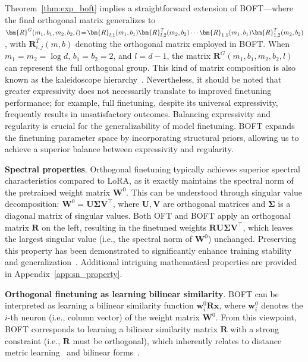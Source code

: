 Theorem~\ref{thm:exp_boft} implies a straightforward extension of BOFT—where the final orthogonal matrix generalizes to $\thickmuskip=2mu \medmuskip=2mu \bm{R}^G(m_1,b_1,m_2,b_2,l)=\bm{R}_{l,1}(m_1,b_1)\bm{R}_{l,2}^T(m_2,b_2)\cdots\bm{R}_{1,1}(m_1,b_1)\bm{R}_{1,2}^T(m_2,b_2)$, with $\bm{R}_{i,j}^T(m,b)$ denoting the orthogonal matrix employed in BOFT. When $m_1=m_2=\log d$, $b_1=b_2=2$, and $l=d-1$, the matrix $\bm{R}^G(m_1,b_1,m_2,b_2,l)$ can represent the full orthogonal group. This kind of matrix composition is also known as the kaleidoscope hierarchy~\cite{dao2019kaleidoscope}. Nevertheless, it should be noted that greater expressivity does not necessarily translate to improved finetuning performance; for example, full finetuning, despite its universal expressivity, frequently results in unsatisfactory outcomes. Balancing expressivity and regularity is crucial for the generalizability of model finetuning. BOFT expands the finetuning parameter space by incorporating structural priors, allowing us to achieve a superior balance between expressivity and regularity.

\textbf{Spectral properties}. Orthogonal finetuning typically achieves superior spectral characteristics compared to LoRA, as it exactly maintains the spectral norm of the pretrained weight matrix $\bm{W}^0$. This can be understood through singular value decomposition: $\bm{W}^0=\bm{U}\bm{\Sigma}\bm{V}^\top$, where $\bm{U},\bm{V}$ are orthogonal matrices and $\bm{\Sigma}$ is a diagonal matrix of singular values. Both OFT and BOFT apply an orthogonal matrix $\bm{R}$ on the left, resulting in the finetuned weights $\bm{R}\bm{U}\bm{\Sigma}\bm{V}^\top$, which leaves the largest singular value (i.e., the spectral norm of $\bm{W}^0$) unchanged. Preserving this property has been demonstrated to significantly enhance training stability and generalization~\cite{miyato2018spectral,yoshida2017spectral}. Additional intriguing mathematical properties are provided in Appendix~\ref{app:sn_property}.

\textbf{Orthogonal finetuning as learning bilinear similarity}. BOFT can be interpreted as learning a bilinear similarity function $\bm{w}^0_i\bm{R}\bm{x}$, where $\bm{w}^0_i$ denotes the $i$-th neuron (i.e., column vector) of the weight matrix $\bm{W}^0$. From this viewpoint, BOFT corresponds to learning a bilinear similarity matrix $\bm{R}$ with a strong constraint (i.e., $\bm{R}$ must be orthogonal), which inherently relates to distance metric learning~\cite{xing2002distance} and bilinear forms~\cite{roman2005advanced}.

